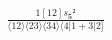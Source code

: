 \documentclass[varwidth, border=5pt]{standalone}
\begin{document}
\begin{my}
$\begin{gathered}
\scriptscriptstyle\frac{1[12]s_{𝟓}²}{⟨12⟩⟨23⟩⟨34⟩⟨4|1+3|2]}
\end{gathered}$
\end{my}
\end{document}

